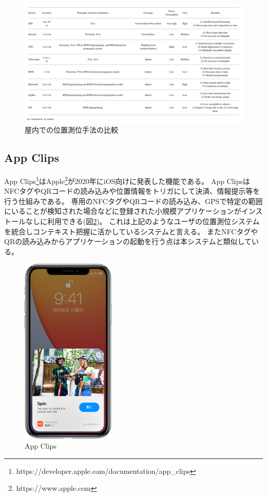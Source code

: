 \begin{figure}[H]
  \centering 
  \includegraphics[width=120mm]{images/IndoorLocalization.png}
  \caption{屋内での位置測位手法の比較} \label{fig:IndoorLocalization}
\end{figure}


\subsection{App Clips}
App Clips\footnote{\textsf{https://developer.apple.com/documentation/app\_clips}}はApple\footnote{\textsf{https://www.apple.com}}が2020年にiOS向けに発表した機能である。
App ClipsはNFCタグやQRコードの読み込みや位置情報をトリガにして決済、情報提示等を行う仕組みである。
専用のNFCタグやQRコードの読み込み、GPSで特定の範囲にいることが検知された場合などに登録された小規模アプリケーションがインストールなしに利用できる(図\ref{fig:appClips})。
これは上記のようなユーザの位置測位システムを統合しコンテキスト把握に活かしているシステムと言える。
またNFCタグやQRの読み込みからアプリケーションの起動を行う点は本システムと類似している。

\begin{figure}[H]
  \centering 
  \includegraphics[height=90mm]{images/appClips.png}
  \caption{App Clips} \label{fig:appClips}
\end{figure}

